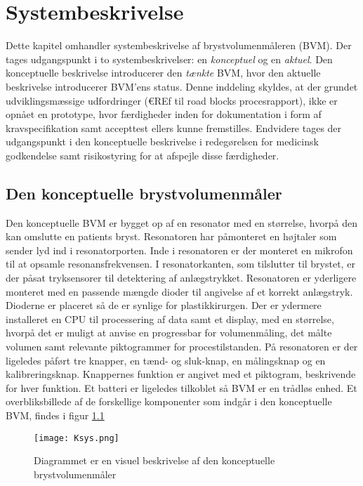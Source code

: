 \chapter{Systembeskrivelse}
Dette kapitel omhandler systembeskrivelse af brystvolumenmåleren (BVM). Der tages udgangspunkt i to systembeskrivelser: en \textit{konceptuel} og en \textit{aktuel}. Den konceptuelle beskrivelse introducerer den \textit{tænkte} BVM, hvor den aktuelle beskrivelse introducerer BVM'ens status. Denne inddeling skyldes, at der grundet udviklingsmæssige udfordringer (€REf til road blocks procesrapport), ikke er opnået en prototype, hvor færdigheder inden for dokumentation i form af kravspecifikation samt accepttest ellers kunne fremstilles. Endvidere tages der udgangspunkt i den konceptuelle beskrivelse i redegørelsen for medicinsk godkendelse samt risikostyring for at afspejle disse færdigheder.   

\section{Den konceptuelle brystvolumenmåler} \label{sec:BVMopb}
	
	Den konceptuelle BVM er bygget op af en resonator med en størrelse, hvorpå den kan omslutte en patients bryst. Resonatoren har påmonteret en højtaler som sender lyd ind i resonatorporten. Inde i resonatoren er der monteret en mikrofon til at opsamle resonansfrekvensen. I resonatorkanten, som tilslutter til brystet, er der påsat tryksensorer til detektering af anlægstrykket. Resonatoren er yderligere monteret med en passende mængde dioder til angivelse af et korrekt anlægstryk. Dioderne er placeret så de er synlige for plastikkirurgen. Der er ydermere installeret en CPU til processering af data samt et display, med en størrelse, hvorpå det er muligt at anvise en progressbar for volumenmåling, det målte volumen samt relevante piktogrammer for procestilstanden. På resonatoren er der ligeledes påført tre knapper, en tænd- og sluk-knap, en målingsknap og en kalibreringsknap. Knappernes funktion er angivet med et piktogram, beskrivende for hver funktion. Et batteri er ligeledes tilkoblet så BVM er en trådløs enhed. Et overbliksbillede af de forskellige komponenter som indgår i den konceptuelle BVM, findes i figur \ref{fig:ksys} 
		
\vspace{5mm}  
		
		\begin{figure}[htb]
			\centering
				\texttt{[image: Ksys.png]}
				\caption{Diagrammet er en visuel beskrivelse af den konceptuelle brystvolumenmåler}	
				\label{fig:ksys}
			\end{figure}	     
		
